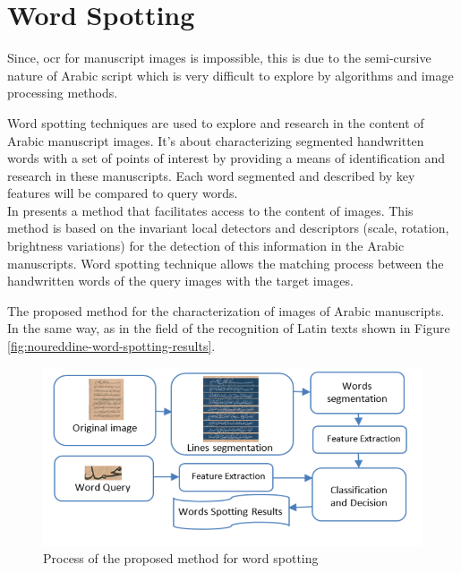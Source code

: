 \section{Word Spotting}
Since, \acrshort{ocr} for manuscript images is impossible, this is due to the semi-cursive nature of Arabic script which is very difficult to explore by algorithms and image processing methods.

\noindent
Word spotting techniques are used to explore and research in the content of Arabic manuscript images. It’s about characterizing segmented handwritten words with a set of points of interest by providing a means of identification and research in these manuscripts. Each word segmented and described by key features will be compared to query words. \\

In \cite{Noureddine} presents a method that facilitates access to the content of images. This method is based on the invariant local detectors and descriptors (scale, rotation, brightness variations) for the detection of this information in the Arabic manuscripts. Word spotting technique allows the matching process between the handwritten words of the query images with the target images. 

The proposed method for the characterization of images of Arabic manuscripts. In the same way, as in the field of the recognition of Latin texts shown in Figure \ref{fig:noureddine-word-spotting-results}.
\begin{figure}[!htb]
    \centering
    \includegraphics[width=13cm]{images/noureddine-word-spotting.png}
    \caption{Process of the proposed method for word spotting}
    \label{fig:noureddine-word-spotting}
\end{figure}

